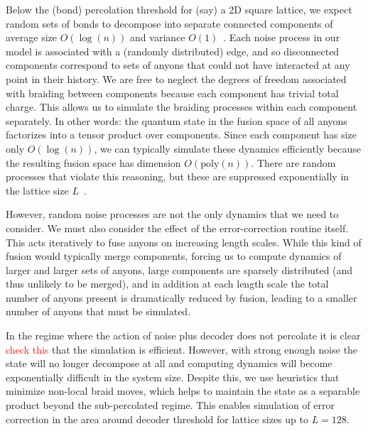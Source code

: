 \documentclass[aps, prl, letterpaper, twocolumn, superscriptaddress, notitlepage, 10pt]{revtex4-1}
\newcommand{\dude}[1]{\textcolor{red}{#1}}
\begin{document}
Below the (bond) percolation threshold for (say) a 2D square lattice, we expect random sets of 
bonds to decompose into separate connected components 
of average size $O(\log(n))$ and variance $O(1)$~\cite{Bazant2000}.
Each noise process in our model is associated with a (randomly distributed) edge, and so 
disconnected components correspond to sets of anyons that could not have interacted at any 
point in their history. 
We are free to neglect the degrees of freedom associated with braiding between components 
because each component has trivial total charge.
This allows us to simulate the braiding processes within each component separately. 
In other words: the quantum state in the fusion space of all anyons factorizes into 
a tensor product over components. 
Since each 
component has size only $O(\log(n))$, we can typically simulate these dynamics efficiently 
because the resulting fusion space has dimension $O(\mathrm{poly}(n))$. 
There are 
random processes that violate this reasoning, but these are suppressed 
exponentially in the lattice size $L$~\cite{Grimmett1989}. 

However, random noise processes are not the only dynamics that we need to consider. We 
must also consider the effect of the error-correction routine itself. This acts iteratively to fuse 
anyons on increasing length scales. While this kind of fusion would typically merge components, 
forcing us to compute dynamics of larger and larger sets of anyons,
large components are sparsely distributed
(and thus unlikely to be merged), and in addition at each length scale the total number of 
anyons present is dramatically reduced by fusion, leading to a smaller number of anyons that 
must be simulated.

In the regime where the action of noise plus decoder does not percolate
it is clear \dude{check this} that the simulation is efficient.
However, with strong enough noise the state will
no longer decompose at all and computing dynamics will
become exponentially difficult in the system size.
Despite this, we use heuristics %
that minimize non-local braid moves, which helps to
maintain the state as a separable product beyond the
sub-percolated regime.
This enables simulation of error correction in
the area around decoder threshold for lattice sizes up to $L=128.$

\end{document}
